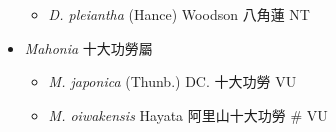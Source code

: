 \begin{itemize}
  \begin{itemize}
        \item[] \textit{D. pleiantha} (Hance) Woodson  八角蓮   NT
  \end{itemize}
 \item[] \textit{Mahonia} 十大功勞屬
                                
  \begin{itemize}
        \item[] \textit{M. japonica} (Thunb.) DC.  十大功勞   VU
        \item[] \textit{M. oiwakensis} Hayata  阿里山十大功勞  \# VU
  \end{itemize}
  \end{itemize}
